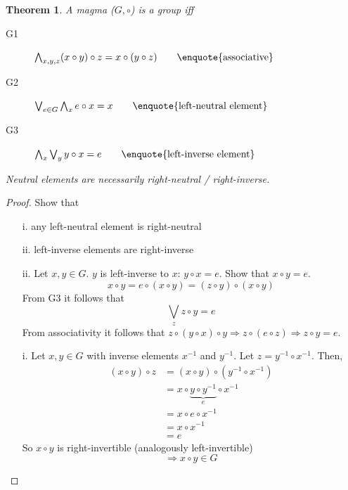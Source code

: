 \documentclass[a4paper,landscape,twocolumn]{article}
\newtheorem{theorem}{Theorem}
\begin{document}
\begin{theorem}
  A magma ($G, \circ$) is a group iff
  \begin{description}
    \item[G1] $\bigwedge_{x,y,z} (x \circ y) \circ z = x \circ (y \circ z) \hspace{20pt} \text{\enquote{associative}}$
    \item[G2] $\bigvee_{e \in G} \bigwedge_{x} e \circ x = x \hspace{20pt} \text{\enquote{left-neutral element}}$
    \item[G3] $\bigwedge_x \bigvee_y y \circ x = e \hspace{20pt} \text{\enquote{left-inverse element}}$
  \end{description}
  Neutral elements are necessarily right-neutral / right-inverse.
\end{theorem}

\begin{proof}
  Show that
  \begin{itemize}
    \item[i.] any left-neutral element is right-neutral
    \item[ii.] left-inverse elements are right-inverse
  \end{itemize}

  \begin{itemize}
    \item[ii.]  Let $x, y \in G$. $y$ is left-inverse to $x$: $y \circ x = e$.
      Show that $x \circ y = e$.
      \[ x \circ y = e \circ (x \circ y) = (z \circ y) \circ (x \circ y) \]
      From G3 it follows that
      \[ \bigvee_{z} z \circ y = e \]
      From associativity it follows that $z \circ (y \circ x) \circ y \Rightarrow z \circ (e \circ z) \Rightarrow z \circ y = e$.
    \item[i.]
      Let $x, y \in G$ with inverse elements $x^{-1}$ and $y^{-1}$.
      Let $z = y^{-1} \circ x^{-1}$. Then,
      \begin{align*}
        (x \circ y) \circ z &= (x \circ y) \circ (y^{-1} \circ x^{-1}) \\
          &= x \circ \underbrace{y \circ y^{-1}}_{e} \circ x^{-1} \\
          &= x \circ e \circ x^{-1} \\
          &= x \circ x^{-1} \\
          &= e
      \end{align*}
      So $x \circ y$ is right-invertible (analogously left-invertible)
      \[ \Rightarrow x \circ y \in G \]


  \end{itemize}
\end{proof}
\end{document}
